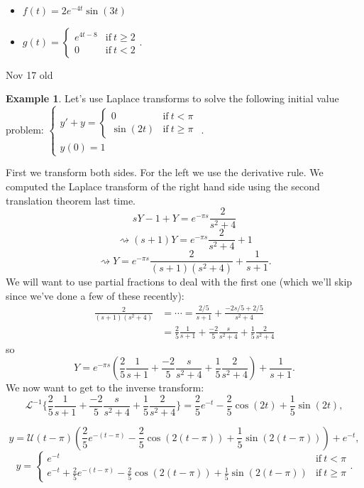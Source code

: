 \documentclass[12pt]{amsart}
\numberwithin{equation}{section}
\theoremstyle{plain} %
\newcommand{\Nov}[1]{Nov #1 old}
\newcommand{\rsa}{\rightsquigarrow}
\theoremstyle{definition}
\newtheorem{ex}[equation]{Example}
\theoremstyle{remark}
\newcommand{\LAi}[1]{\mathcal{L}^{-1}\{ #1 \}}
\newcommand{\U}{\mathcal{U}}
\begin{document}
\begin{enumerate}
\begin{framed}
\begin{itemize}
\item $\displaystyle f(t)=2 e^{-4t} \sin(3t)$
\item$\displaystyle g(t)= \begin{cases} e^{4t-8} &\text{if} \ t\geq 2 \\ 0 &\text{if} \ t<2\end{cases}$.
\end{itemize}
\end{framed}



\end{enumerate}

\Nov{17}
    
\begin{ex}  Let's use Laplace transforms to solve the following initial value problem:
 $\begin{cases} y' + y = \begin{cases}  0 &\text{if} \ t< \pi\\
\sin(2t) & \text{if} \ t\geq \pi \end{cases} \\ y(0)= 1\end{cases}$.

First we transform both sides. For the left we use the derivative rule. We computed the Laplace transform of the right hand side using the second translation theorem last time.
\[ sY -1 + Y = e^{-\pi s} \frac{2}{s^2+4}\]
\[\rsa (s+1) Y = e^{-\pi s} \frac{2}{s^2+4} + 1\]
\[ \rsa Y=  e^{-\pi s} \frac{2}{(s+1)(s^2+4)} + \frac{1}{s+1}.\]
We will want to use partial fractions to deal with the first one (which we'll skip since we've done a few of these recently):
\[ \begin{aligned}
\frac{2}{(s+1)(s^2+4)} &= \cdots = \frac{2/5}{s+1} + \frac{-2s/5 +2/5}{s^2+4} \\&=\frac{2}{5} \frac{1}{s+1} + \frac{-2}{5} \frac{s}{s^2+4} +\frac{1}{5} \frac{2}{s^2+4}\end{aligned}\]
so
\[ Y= e^{-\pi s} \left(\frac{2}{5} \frac{1}{s+1} + \frac{-2}{5} \frac{s}{s^2+4} +\frac{1}{5} \frac{2}{s^2+4}\right) + \frac{1}{s+1}.\]
We now want to get to the inverse transform:
\[ \LAi{\frac{2}{5} \frac{1}{s+1} + \frac{-2}{5} \frac{s}{s^2+4} +\frac{1}{5} \frac{2}{s^2+4}} = \frac{2}{5} e^{-t} - \frac{2}{5} \cos(2t) + \frac{1}{5} \sin(2t),\]

\[ y= \U(t-\pi) \left(\frac{2}{5} e^{-(t-\pi)} - \frac{2}{5} \cos(2(t-\pi)) + \frac{1}{5} \sin(2(t-\pi))\right) + e^{-t},\]
\[ y = \begin{cases} e^{-t} &\text{if} \ t< \pi \\
e^{-t} + \frac{2}{5} e^{-(t-\pi)} - \frac{2}{5} \cos(2(t-\pi)) + \frac{1}{5} \sin(2(t-\pi)) &\text{if} \ t\geq \pi\end{cases}.\]
\end{ex}
\end{document}
